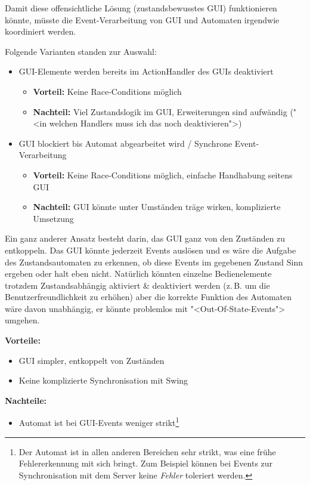 \documentclass[12pt,halfparskip]{scrartcl}
\begin{document}
Damit diese offensichtliche Lösung (zustandsbewusstes GUI) funktionieren könnte, müsste die Event-Verarbeitung von GUI und Automaten irgendwie koordiniert werden.

Folgende Varianten standen zur Auswahl:

\begin{itemize}
	\item GUI-Elemente werden bereits im ActionHandler des GUIs deaktiviert
	\begin{itemize}
		\item \textbf{Vorteil:} Keine Race-Conditions möglich
		\item \textbf{Nachteil:} Viel Zustandslogik im GUI, Erweiterungen sind aufwändig ("<in welchen Handlers muss ich das noch deaktivieren">)
	\end{itemize}
	\item GUI blockiert bis Automat abgearbeitet wird / Synchrone Event-Verarbeitung
	\begin{itemize}
		\item \textbf{Vorteil:} Keine Race-Conditions möglich, einfache Handhabung seitens GUI
		\item \textbf{Nachteil:} GUI könnte unter Umständen träge wirken, komplizierte Umsetzung
	\end{itemize}
\end{itemize}

Ein ganz anderer Ansatz besteht darin, das GUI ganz von den Zuständen zu entkoppeln. Das GUI könnte jederzeit Events auslösen und es wäre die Aufgabe des Zustandsautomaten zu erkennen, ob diese Events im gegebenen Zustand Sinn ergeben oder halt eben nicht. Natürlich könnten einzelne Bedienelemente trotzdem Zustandsabhängig aktiviert \& deaktiviert werden (z.\,B. um die Benutzerfreundlichkeit zu erhöhen) aber die korrekte Funktion des Automaten wäre davon unabhängig, er könnte problemlos mit "<Out-Of-State-Events"> umgehen.

\textbf{Vorteile:}
\begin{itemize}
	\item GUI simpler, entkoppelt von Zuständen
	\item Keine komplizierte Synchronisation mit Swing
\end{itemize}

\textbf{Nachteile:}
\begin{itemize}
	\item Automat ist bei GUI-Events weniger strikt\footnote{Der Automat ist in allen anderen Bereichen sehr strikt, was eine frühe Fehlererkennung mit sich bringt. Zum Beispiel können bei Events zur Synchronisation mit dem Server keine \emph{Fehler} toleriert werden.}
\end{itemize}
\end{document}
